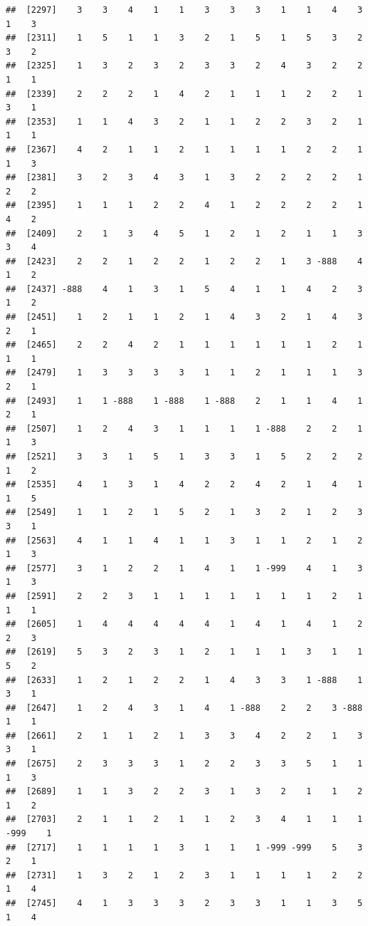 \documentclass[
  12pt,
  openany]{book}
\begin{document}
\begin{verbatim}
##  [2297]    3    3    4    1    1    3    3    3    1    1    4    3    1    3
##  [2311]    1    5    1    1    3    2    1    5    1    5    3    2    3    2
##  [2325]    1    3    2    3    2    3    3    2    4    3    2    2    1    1
##  [2339]    2    2    2    1    4    2    1    1    1    2    2    1    3    1
##  [2353]    1    1    4    3    2    1    1    2    2    3    2    1    1    1
##  [2367]    4    2    1    1    2    1    1    1    1    2    2    1    1    3
##  [2381]    3    2    3    4    3    1    3    2    2    2    2    1    2    2
##  [2395]    1    1    1    2    2    4    1    2    2    2    2    1    4    2
##  [2409]    2    1    3    4    5    1    2    1    2    1    1    3    3    4
##  [2423]    2    2    1    2    2    1    2    2    1    3 -888    4    1    2
##  [2437] -888    4    1    3    1    5    4    1    1    4    2    3    1    2
##  [2451]    1    2    1    1    2    1    4    3    2    1    4    3    2    1
##  [2465]    2    2    4    2    1    1    1    1    1    1    2    1    1    1
##  [2479]    1    3    3    3    3    1    1    2    1    1    1    3    2    1
##  [2493]    1    1 -888    1 -888    1 -888    2    1    1    4    1    2    1
##  [2507]    1    2    4    3    1    1    1    1 -888    2    2    1    1    3
##  [2521]    3    3    1    5    1    3    3    1    5    2    2    2    1    2
##  [2535]    4    1    3    1    4    2    2    4    2    1    4    1    1    5
##  [2549]    1    1    2    1    5    2    1    3    2    1    2    3    3    1
##  [2563]    4    1    1    4    1    1    3    1    1    2    1    2    1    3
##  [2577]    3    1    2    2    1    4    1    1 -999    4    1    3    1    3
##  [2591]    2    2    3    1    1    1    1    1    1    1    2    1    1    1
##  [2605]    1    4    4    4    4    4    1    4    1    4    1    2    2    3
##  [2619]    5    3    2    3    1    2    1    1    1    3    1    1    5    2
##  [2633]    1    2    1    2    2    1    4    3    3    1 -888    1    3    1
##  [2647]    1    2    4    3    1    4    1 -888    2    2    3 -888    1    1
##  [2661]    2    1    1    2    1    3    3    4    2    2    1    3    3    1
##  [2675]    2    3    3    3    1    2    2    3    3    5    1    1    1    3
##  [2689]    1    1    3    2    2    3    1    3    2    1    1    2    1    2
##  [2703]    2    1    1    2    1    1    2    3    4    1    1    1 -999    1
##  [2717]    1    1    1    1    3    1    1    1 -999 -999    5    3    2    1
##  [2731]    1    3    2    1    2    3    1    1    1    1    2    2    1    4
##  [2745]    4    1    3    3    3    2    3    3    1    1    3    5    1    4

\end{verbatim}
\end{document}
